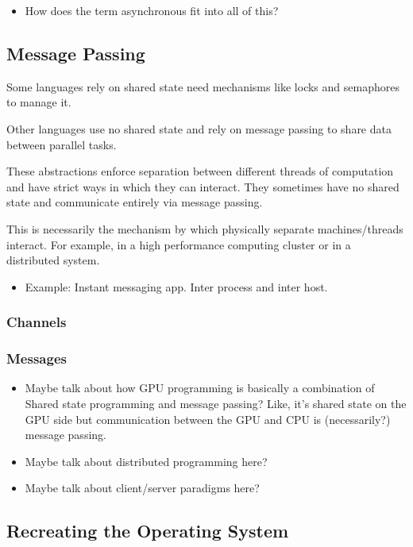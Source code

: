 \documentclass{article}
\begin{document}
\begin{itemize}
  \item How does the term asynchronous fit into all of this?
\end{itemize}

\subsection{Message Passing}
Some languages rely on shared state need mechanisms like
locks and semaphores to manage it.

Other languages use no shared state and rely on message passing to
share data between parallel tasks.

These abstractions enforce separation between different threads of
computation and have strict ways in which they can interact. They
sometimes have no shared state and communicate entirely via message
passing.

This is necessarily the mechanism by which physically separate machines/threads
interact. For example, in a high performance computing cluster or in a
distributed system.

\begin{itemize}
  \item Example: Instant messaging app. Inter process and inter host.
\end{itemize}

\subsubsection{Channels}
\subsubsection{Messages}

\begin{itemize}
  \item Maybe talk about how GPU programming is basically a combination of
        Shared state programming and message passing? Like, it's shared state on
        the GPU side but communication between the GPU and CPU is (necessarily?)
        message passing.
  \item Maybe talk about distributed programming here?
  \item Maybe talk about client/server paradigms here?
\end{itemize}

\subsection{Recreating the Operating System}
\end{document}
